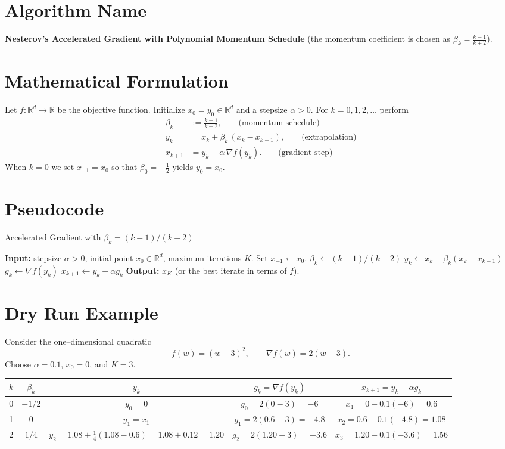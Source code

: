 \documentclass{article}
\newcommand{\grad}{\nabla}
\newcommand{\R}{\mathbb{R}}
\begin{document}
\section*{Algorithm Name}
\textbf{Nesterov’s Accelerated Gradient with Polynomial Momentum Schedule}  
(the momentum coefficient is chosen as $\displaystyle \beta_k=\frac{k-1}{k+2}$).

\section*{Mathematical Formulation}
Let $f:\R^d\rightarrow\R$ be the objective function.  
Initialize $x_{0}=y_{0}\in\R^{d}$ and a stepsize $\alpha>0$.  
For $k=0,1,2,\dots$ perform
\begin{align}
    \beta_k &:= \frac{k-1}{k+2},\qquad\text{(momentum schedule)}\label{eq:beta}\\[4pt]
    y_k    &= x_k + \beta_k\,(x_k-x_{k-1}),\qquad\text{(extrapolation)}\label{eq:y}\\[4pt]
    x_{k+1}&= y_k - \alpha\,\grad f(y_k).\qquad\text{(gradient step)}\label{eq:x}
\end{align}
When $k=0$ we set $x_{-1}=x_0$ so that $\beta_0= -\frac{1}{2}$ yields $y_0=x_0$.

\section*{Pseudocode}
\begin{algorithm}[H]
\caption{Accelerated Gradient with $\beta_k=(k-1)/(k+2)$}
\begin{algorithmic}[1]
\STATE \textbf{Input:} stepsize $\alpha>0$, initial point $x_0\in\R^d$, maximum iterations $K$.
\STATE Set $x_{-1}\gets x_0$.
    \STATE $\beta_k \gets (k-1)/(k+2)$
    \STATE $y_k \gets x_k + \beta_k (x_k - x_{k-1})$
    \STATE $g_k \gets \grad f(y_k)$
    \STATE $x_{k+1} \gets y_k - \alpha g_k$
\ENDFOR
\STATE \textbf{Output:} $x_K$ (or the best iterate in terms of $f$).
\end{algorithmic}
\end{algorithm}

\section*{Dry Run Example}
Consider the one–dimensional quadratic
\[
f(w) = (w-3)^2, \qquad \grad f(w)=2(w-3).
\]
Choose $\alpha=0.1$, $x_0=0$, and $K=3$.

\begin{tabular}{c|c|c|c|c}
$k$ & $\beta_k$ & $y_k$ & $g_k=\grad f(y_k)$ & $x_{k+1}=y_k-\alpha g_k$ \\ \hline
0 & $-1/2$ & $y_0 = 0$ & $g_0 = 2(0-3)=-6$ & $x_1 = 0 -0.1(-6)=0.6$ \\[4pt]
1 & $0$   & $y_1 = x_1$ & $g_1 = 2(0.6-3)=-4.8$ & $x_2 = 0.6 -0.1(-4.8)=1.08$ \\[4pt]
2 & $1/4$ & $y_2 = 1.08 + \tfrac14(1.08-0.6)=1.08+0.12=1.20$ &
$g_2 = 2(1.20-3)=-3.6$ & $x_3 = 1.20-0.1(-3.6)=1.56$
\end{tabular}
\end{document}
